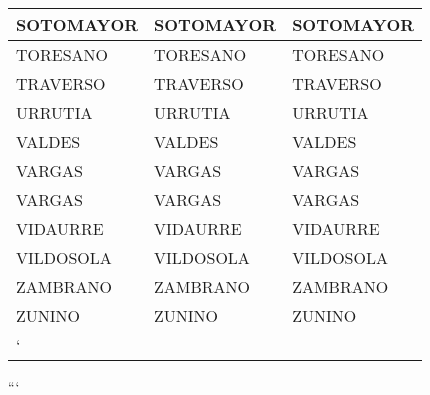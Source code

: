 \begin{table}[h]
\begin{tabular}{|l|l|l|}
SOTOMAYOR            &SOTOMAYOR           &SOTOMAYOR           \\ \hline
TORESANO             &TORESANO            &TORESANO            \\ \hline
TRAVERSO             &TRAVERSO            &TRAVERSO            \\ \hline
URRUTIA              &URRUTIA             &URRUTIA             \\ \hline
VALDES               &VALDES              &VALDES              \\ \hline
VARGAS               &VARGAS              &VARGAS              \\ \hline
VARGAS               &VARGAS              &VARGAS              \\ \hline
VIDAURRE             &VIDAURRE            &VIDAURRE            \\ \hline
VILDOSOLA            &VILDOSOLA           &VILDOSOLA           \\ \hline
ZAMBRANO             &ZAMBRANO            &ZAMBRANO            \\ \hline
ZUNINO               &ZUNINO              &ZUNINO              \\ \hline
`\end{tabular}

\end{table}

```